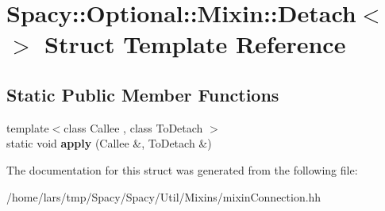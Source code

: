 \hypertarget{structSpacy_1_1Optional_1_1Mixin_1_1Detach_3_4}{}\section{Spacy\+:\+:Optional\+:\+:Mixin\+:\+:Detach$<$$>$ Struct Template Reference}
\label{structSpacy_1_1Optional_1_1Mixin_1_1Detach_3_4}
\subsection*{Static Public Member Functions}
\begin{DoxyCompactItemize}
\item 
{\footnotesize template$<$class Callee , class To\+Detach $>$ }\\static void {\bfseries apply} (Callee \&, To\+Detach \&)\hypertarget{structSpacy_1_1Optional_1_1Mixin_1_1Detach_3_4_a1ab6239f02532537e4b908bcc5cd77d1}{}\label{structSpacy_1_1Optional_1_1Mixin_1_1Detach_3_4_a1ab6239f02532537e4b908bcc5cd77d1}

\end{DoxyCompactItemize}


The documentation for this struct was generated from the following file\+:\begin{DoxyCompactItemize}
\item 
/home/lars/tmp/\+Spacy/\+Spacy/\+Util/\+Mixins/mixin\+Connection.\+hh\end{DoxyCompactItemize}
